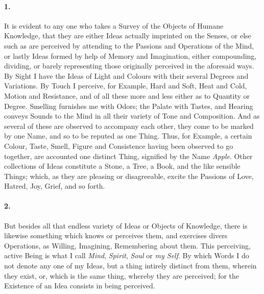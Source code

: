 \documentclass[]{article}
\newenvironment{sectionbody}{}{}
\begin{document}
\begin{sectionbody}

\paragraph{1.} It is evident to any one who takes a Survey of the Objects of
Humane Knowledge, that they are either Ideas actually imprinted
on the Senses, or else such as are perceived by attending to the
Passions and Operations of the Mind, or lastly Ideas formed by
help of Memory and Imagination, either compounding, dividing, or
barely representing those originally perceived in the aforesaid
ways.  By Sight I have the Ideas of Light and Colours with their
several Degrees and Variations.  By Touch I perceive, for
Example, Hard and Soft, Heat and Cold, Motion and Resistance, and
of all these more and less either as to Quantity or Degree.
Smelling furnishes me with Odors; the Palate with Tastes, and
Hearing conveys Sounds to the Mind in all their variety of Tone
and Composition.  And as several of these are observed to
accompany each other, they come to be marked by one Name, and so
to be reputed as one Thing.  Thus, for Example, a certain Colour,
Taste, Smell, Figure and Consistence having been observed to go
together, are accounted one distinct Thing, signified by the Name
\emph{Apple}.  Other collections of Ideas constitute a Stone, a
Tree, a Book, and the like sensible Things; which, as they are
pleasing or disagreeable, excite the Passions of Love, Hatred,
Joy, Grief, and so forth.



\paragraph{2.} But besides all that endless variety of Ideas or Objects of
Knowledge, there is likewise something which knows or perceives
them, and exercises divers Operations, as Willing, Imagining,
Remembering about them.  This perceiving, active Being is what I
call \emph{Mind}, \emph{Spirit}, \emph{Soul} or \emph{my
Self}.  By which Words I do not denote any one of my Ideas,
but a thing intirely distinct from them, wherein they exist, or,
which is the same thing, whereby they are perceived; for the
Existence of an Idea consists in being perceived.




\end{sectionbody}
\end{document}
